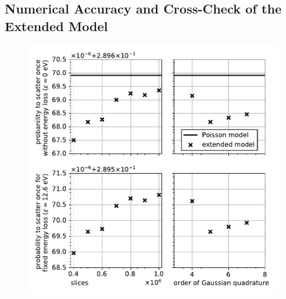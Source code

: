 \subsection{Numerical Accuracy and Cross-Check of the Extended Model}
\label{sec:eDepScatCrossSecExtendedModelNumEval}
\begin{figure}[t]
	\centering
	\includegraphics{chapter/energyDependentCrossSec/fig/scatProb1_numericalAccuracy.pdf}

\end{figure}
